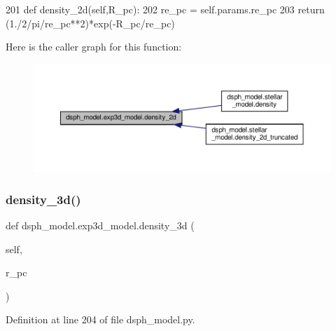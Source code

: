 \begin{DoxyCode}
201     \textcolor{keyword}{def }density\_2d(self,R\_pc):
202         re\_pc = self.params.re\_pc
203         \textcolor{keywordflow}{return} (1./2/pi/re\_pc**2)*exp(-R\_pc/re\_pc) 
\end{DoxyCode}
Here is the caller graph for this function\+:\nopagebreak
\begin{figure}[H]
\begin{center}
\leavevmode
\includegraphics[width=350pt]{dc/d37/classdsph__model_1_1exp3d__model_ab510e347adc62697068885282a6f477a_icgraph}
\end{center}
\end{figure}
\mbox{\label{classdsph__model_1_1exp3d__model_ae31f24dee429dda1409429bf62fea05d}} 
\subsubsection{\texorpdfstring{density\+\_\+3d()}{density\_3d()}}
{\footnotesize\ttfamily def dsph\+\_\+model.\+exp3d\+\_\+model.\+density\+\_\+3d (\begin{DoxyParamCaption}\item[{}]{self,  }\item[{}]{r\+\_\+pc }\end{DoxyParamCaption})}



Definition at line 204 of file dsph\+\_\+model.\+py.


